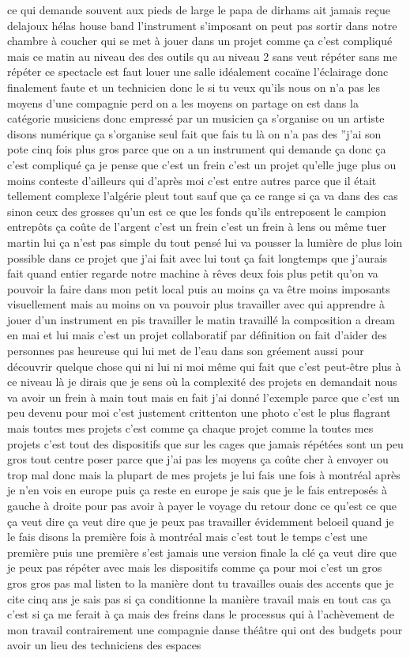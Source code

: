 ce qui demande souvent aux pieds de large le papa de dirhams ait jamais reçue delajoux hélas house band l'instrument s'imposant on peut pas sortir dans notre chambre à coucher qui se met à jouer dans un projet comme ça c'est compliqué mais ce matin au niveau des des outils qu au niveau 2 sans veut répéter sans me répéter ce spectacle est faut louer une salle idéalement cocaïne l'éclairage donc finalement faute et un technicien donc le si tu veux qu'ils nous on n'a pas les moyens d'une compagnie perd on a les moyens on partage on est dans la catégorie musiciens donc empressé par un musicien ça s'organise ou un artiste disons numérique ça s'organise seul fait que fais tu là on n'a pas des ''j'ai son pote cinq fois plus gros parce que on a un instrument qui demande ça donc ça c'est compliqué ça je pense que c'est un frein c'est un projet qu'elle juge plus ou moins conteste d'ailleurs qui d'après moi c'est entre autres parce que il était tellement complexe l'algérie pleut tout sauf que ça ce range si ça va dans des cas sinon ceux des grosses qu'un est ce que les fonds qu'ils entreposent le campion entrepôts ça coûte de l'argent c'est un frein c'est un frein à lens ou même tuer martin lui ça n'est pas simple du tout pensé lui va pousser la lumière de plus loin possible dans ce projet que j'ai fait avec lui tout ça fait longtemps que j'aurais fait quand entier regarde notre machine à rêves deux fois plus petit qu'on va pouvoir la faire dans mon petit local puis au moins ça va être moins imposants visuellement mais au moins on va pouvoir plus travailler avec qui apprendre à jouer d'un instrument en pis travailler le matin travaillé la composition a dream en mai et lui mais c'est un projet collaboratif par définition on fait d'aider des personnes pas heureuse qui lui met de l'eau dans son gréement aussi pour découvrir quelque chose qui ni lui ni moi même qui fait que c'est peut-être plus à ce niveau là je dirais que je sens où la complexité des projets en demandait nous va avoir un frein à main tout mais en fait j'ai donné l'exemple parce que c'est un peu devenu pour moi c'est justement crittenton une photo c'est le plus flagrant mais toutes mes projets c'est comme ça chaque projet comme la toutes mes projets c'est tout des dispositifs que sur les cages que jamais répétées sont un peu gros tout centre poser parce que j'ai pas les moyens ça coûte cher à envoyer ou trop mal donc mais la plupart de mes projets je lui fais une fois à montréal après je n'en vois en europe puis ça reste en europe je sais que je le fais entreposés à gauche à droite pour pas avoir à payer le voyage du retour donc ce qu'est ce que ça veut dire ça veut dire que je peux pas travailler évidemment beloeil quand je le fais disons la première fois à montréal mais c'est tout le temps c'est une première puis une première s'est jamais une version finale la clé ça veut dire que je peux pas répéter avec mais les dispositifs comme ça pour moi c'est un gros gros gros pas mal listen to la manière dont tu travailles ouais des accents que je cite cinq ans je sais pas si ça conditionne la manière travail mais en tout cas ça c'est si ça me ferait à ça mais des freins dans le processus qui à l'achèvement de mon travail contrairement une compagnie danse théâtre qui ont des budgets pour avoir un lieu des techniciens des espaces 